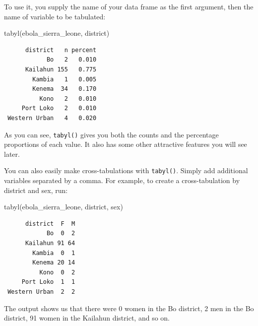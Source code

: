 \documentclass[
  letterpaper,
  DIV=11,
  numbers=noendperiod]{scrreprt}
\newenvironment{Shaded}{\begin{snugshade}}{\end{snugshade}}
\newcommand{\FunctionTok}[1]{\textcolor[rgb]{0.28,0.35,0.67}{#1}}
\newcommand{\NormalTok}[1]{\textcolor[rgb]{0.00,0.23,0.31}{#1}}
\begin{document}
To use it, you supply the name of your data frame as the first argument,
then the name of variable to be tabulated:

\begin{Shaded}
\begin{Highlighting}[]
\FunctionTok{tabyl}\NormalTok{(ebola\_sierra\_leone, district)}
\end{Highlighting}
\end{Shaded}

\begin{verbatim}
      district   n percent
            Bo   2   0.010
      Kailahun 155   0.775
        Kambia   1   0.005
        Kenema  34   0.170
          Kono   2   0.010
     Port Loko   2   0.010
 Western Urban   4   0.020
\end{verbatim}

As you can see, \texttt{tabyl()} gives you both the counts and the
percentage proportions of each value. It also has some other attractive
features you will see later.

\begin{tcolorbox}[enhanced jigsaw, colframe=quarto-callout-note-color-frame, rightrule=.15mm, opacityback=0, breakable, coltitle=black, colbacktitle=quarto-callout-note-color!10!white, bottomrule=.15mm, leftrule=.75mm, toprule=.15mm, arc=.35mm, bottomtitle=1mm, colback=white, left=2mm, opacitybacktitle=0.6, titlerule=0mm, title=\textcolor{quarto-callout-note-color}{\faInfo}\hspace{0.5em}{Pro Tip}, toptitle=1mm]

You can also easily make cross-tabulations with \texttt{tabyl()}. Simply
add additional variables separated by a comma. For example, to create a
cross-tabulation by district and sex, run:

\begin{Shaded}
\begin{Highlighting}[]
\FunctionTok{tabyl}\NormalTok{(ebola\_sierra\_leone, district, sex)}
\end{Highlighting}
\end{Shaded}

\begin{verbatim}
      district  F  M
            Bo  0  2
      Kailahun 91 64
        Kambia  0  1
        Kenema 20 14
          Kono  0  2
     Port Loko  1  1
 Western Urban  2  2
\end{verbatim}

The output shows us that there were 0 women in the Bo district, 2 men in
the Bo district, 91 women in the Kailahun district, and so on.

\end{tcolorbox}
\end{document}
